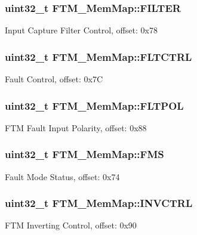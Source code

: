 \subsubsection[{F\+I\+L\+T\+E\+R}]{\setlength{\rightskip}{0pt plus 5cm}uint32\+\_\+t F\+T\+M\+\_\+\+Mem\+Map\+::\+F\+I\+L\+T\+E\+R}\label{struct_f_t_m___mem_map_af3c88a62b68d6b62793ce078ae72d31b}
Input Capture Filter Control, offset\+: 0x78 \hypertarget{struct_f_t_m___mem_map_ab04c5a66d20efe200fa625cbb15ab678}{}
\subsubsection[{F\+L\+T\+C\+T\+R\+L}]{\setlength{\rightskip}{0pt plus 5cm}uint32\+\_\+t F\+T\+M\+\_\+\+Mem\+Map\+::\+F\+L\+T\+C\+T\+R\+L}\label{struct_f_t_m___mem_map_ab04c5a66d20efe200fa625cbb15ab678}
Fault Control, offset\+: 0x7\+C \hypertarget{struct_f_t_m___mem_map_a0ed846091be8a3e998d93d2bc45f78dd}{}
\subsubsection[{F\+L\+T\+P\+O\+L}]{\setlength{\rightskip}{0pt plus 5cm}uint32\+\_\+t F\+T\+M\+\_\+\+Mem\+Map\+::\+F\+L\+T\+P\+O\+L}\label{struct_f_t_m___mem_map_a0ed846091be8a3e998d93d2bc45f78dd}
F\+T\+M Fault Input Polarity, offset\+: 0x88 \hypertarget{struct_f_t_m___mem_map_a7240bf4b5ae452ac8b2beb8c6f26833c}{}
\subsubsection[{F\+M\+S}]{\setlength{\rightskip}{0pt plus 5cm}uint32\+\_\+t F\+T\+M\+\_\+\+Mem\+Map\+::\+F\+M\+S}\label{struct_f_t_m___mem_map_a7240bf4b5ae452ac8b2beb8c6f26833c}
Fault Mode Status, offset\+: 0x74 \hypertarget{struct_f_t_m___mem_map_afd87045c28b90c41492f23d268554433}{}
\subsubsection[{I\+N\+V\+C\+T\+R\+L}]{\setlength{\rightskip}{0pt plus 5cm}uint32\+\_\+t F\+T\+M\+\_\+\+Mem\+Map\+::\+I\+N\+V\+C\+T\+R\+L}\label{struct_f_t_m___mem_map_afd87045c28b90c41492f23d268554433}
F\+T\+M Inverting Control, offset\+: 0x90 \hypertarget{struct_f_t_m___mem_map_a5ad801f060851969c07a2c3f3a108ade}{}

